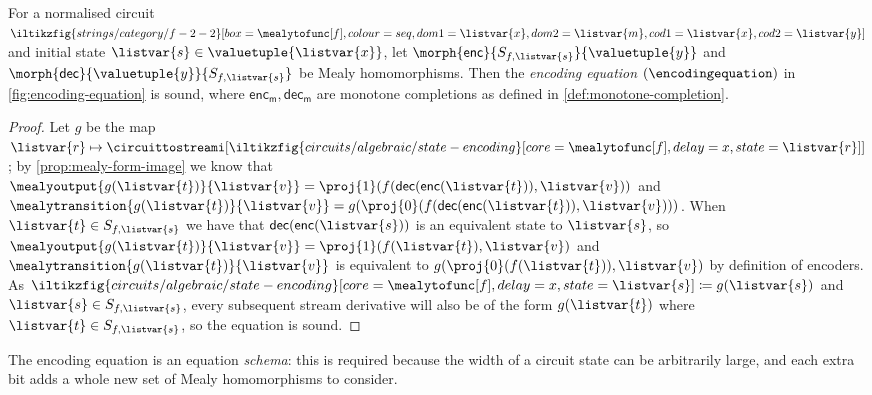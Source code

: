 \begin{proposition}\label{prop:encoding-equation}
    For a normalised circuit \(
    \iltikzfig{strings/category/f-2-2}[box=\mealytofunc[f],colour=seq,dom1=\listvar{x},dom2=\listvar{m},cod1=\listvar{x},cod2=\listvar{y}]
    \) and initial state \(\listvar{s} \in \valuetuple{\listvar{x}}\), let
    \(\morph{\mathsf{enc}}{S_{f,\listvar{s}}}{\valuetuple{y}}\) and
    \(\morph{\mathsf{dec}}{\valuetuple{y}}{S_{f, \listvar{s}}}\) be Mealy
    homomorphisms.
    Then the \emph{encoding equation} \((\encodingequation)\) in
    \cref{fig:encoding-equation} is sound, where
    \(\mathsf{enc}_\mathsf{m},\mathsf{dec}_\mathsf{m}\) are monotone completions
    as defined in \cref{def:monotone-completion}.
\end{proposition}
\begin{proof}
    Let \(g\) be the map \(\listvar{r} \mapsto
    \circuittostreami[\iltikzfig{circuits/algebraic/state-encoding}[core=\mealytofunc[f],delay=x,state=\listvar{r}]]
    \); by \cref{prop:mealy-form-image} we know that \(
    \mealyoutput{g(\listvar{t})}{\listvar{v}}
    =
    \proj{1}(f(\mathsf{dec}(\mathsf{enc}(\listvar{t})), \listvar{v}))
    \) and \(
    \mealytransition{g(\listvar{t})}{\listvar{v}}
    =
    g(\proj{0}(f(\mathsf{dec}(\mathsf{enc}(\listvar{t})), \listvar{v})))
    \).
    When \(\listvar{t} \in S_{f, \listvar{s}}\) we have that \(
    \mathsf{dec}(\mathsf{enc}(\listvar{s}))\) is an equivalent state to
    \(\listvar{s}\),
    so
    \(
    \mealyoutput{g(\listvar{t})}{\listvar{v}}
    =
    \proj{1}(f(\listvar{t}), \listvar{v})
    \) and \(
    \mealytransition{g(\listvar{t})}{\listvar{v}}
    \) is equivalent to \(
    g(\proj{0}(f(\listvar{t})), \listvar{v})
    \) by definition of encoders.
    As \(
    \iltikzfig{circuits/algebraic/state-encoding}[core=\mealytofunc[f],delay=x,state=\listvar{s}]
    \coloneqq
    g(\listvar{s})
    \) and \(\listvar{s} \in S_{f,\listvar{s}}\),
    every subsequent stream derivative will also be of the form
    \(g(\listvar{t})\) where \(\listvar{t} \in S_{f,\listvar{s}}\), so the
    equation is sound.
\end{proof}

\begin{remark}
    The encoding equation is an equation \emph{schema}: this is required because
    the width of a circuit state can be arbitrarily large, and each extra bit
    adds a whole new set of Mealy homomorphisms to consider.
\end{remark}

